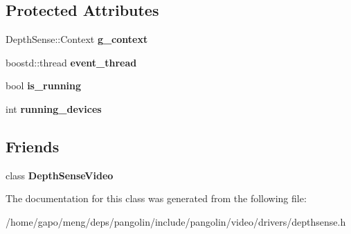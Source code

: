 \subsection*{Protected Attributes}
\begin{DoxyCompactItemize}
\item 
Depth\+Sense\+::\+Context {\bfseries g\+\_\+context}\hypertarget{classpangolin_1_1_depth_sense_context_a4fd9e52fb37ca4124c50ca833440d01a}{}\label{classpangolin_1_1_depth_sense_context_a4fd9e52fb37ca4124c50ca833440d01a}

\item 
boostd\+::thread {\bfseries event\+\_\+thread}\hypertarget{classpangolin_1_1_depth_sense_context_a6a56bedac63b7d64c91632c3c9553160}{}\label{classpangolin_1_1_depth_sense_context_a6a56bedac63b7d64c91632c3c9553160}

\item 
bool {\bfseries is\+\_\+running}\hypertarget{classpangolin_1_1_depth_sense_context_a636fdcd1c7e8e81acaf3d488ace5dc97}{}\label{classpangolin_1_1_depth_sense_context_a636fdcd1c7e8e81acaf3d488ace5dc97}

\item 
int {\bfseries running\+\_\+devices}\hypertarget{classpangolin_1_1_depth_sense_context_ad92dd2ca0ae080d194aa01801a32e4f3}{}\label{classpangolin_1_1_depth_sense_context_ad92dd2ca0ae080d194aa01801a32e4f3}

\end{DoxyCompactItemize}
\subsection*{Friends}
\begin{DoxyCompactItemize}
\item 
class {\bfseries Depth\+Sense\+Video}\hypertarget{classpangolin_1_1_depth_sense_context_a0580f16d7b7ead7adb6a44bdd4730f71}{}\label{classpangolin_1_1_depth_sense_context_a0580f16d7b7ead7adb6a44bdd4730f71}

\end{DoxyCompactItemize}


The documentation for this class was generated from the following file\+:\begin{DoxyCompactItemize}
\item 
/home/gapo/meng/deps/pangolin/include/pangolin/video/drivers/depthsense.\+h\end{DoxyCompactItemize}
